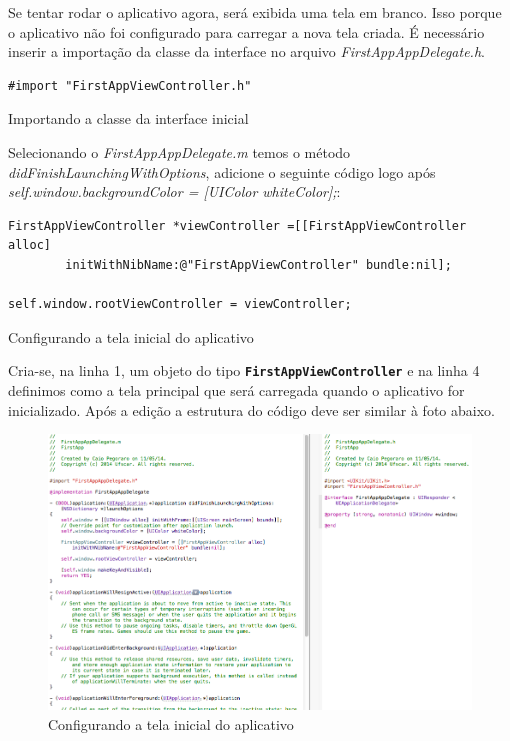 \documentclass[a4paper,12pt,brazil,doubleside]{book}
\begin{document}
\begin{singlespace}
\bigskip


Se tentar rodar o aplicativo agora, será exibida uma tela em branco. Isso porque o aplicativo não foi configurado para carregar a nova tela criada. É necessário inserir a importação da classe da interface no arquivo \emph{FirstAppAppDelegate.h}.

\begin{listing}[H]
\begin{verbatim}
#import "FirstAppViewController.h"
\end{verbatim}
\caption{Importando a classe da interface inicial}
\end{listing}


Selecionando o \emph{FirstAppAppDelegate.m} temos o método \emph{didFinishLaunchingWithOptions}, adicione o seguinte código logo após \emph{self.window.backgroundColor = [UIColor whiteColor];}:

\begin{listing}[H]
\begin{verbatim}
FirstAppViewController *viewController =[[FirstAppViewController alloc] 
		initWithNibName:@"FirstAppViewController" bundle:nil];
		
self.window.rootViewController = viewController;    
\end{verbatim}
\caption{Configurando a tela inicial do aplicativo}
\end{listing}


Cria-se, na linha 1, um objeto do tipo \texttt{\textbf{FirstAppViewController}} e na linha 4 definimos como a tela principal que será carregada quando o aplicativo for inicializado. Após a edição a estrutura do código deve ser similar à foto abaixo.

\begin{figure}[H]
  \centering
  \includegraphics[width=.90\textwidth]{figuras/3/tela_novo_projeto_17.png}
  \caption{Configurando a tela inicial do aplicativo}
  \label{fig:a}
\end{figure}



\end{singlespace}
\end{document}
